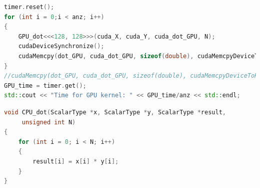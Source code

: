 \documentclass[11pt,a4paper]{article}
\begin{document}
\begin{lstlisting}[language=C++, caption={CUDA benchmark}]
timer.reset();
for (int i = 0;i < anz; i++)
{
	GPU_dot<<<128, 128>>>(cuda_X, cuda_Y, cuda_dot_GPU, N);
	cudaDeviceSynchronize();
	cudaMemcpy(dot_GPU, cuda_dot_GPU, sizeof(double), cudaMemcpyDeviceToHost);
}
//cudaMemcpy(dot_GPU, cuda_dot_GPU, sizeof(double), cudaMemcpyDeviceToHost);
GPU_time = timer.get();
std::cout << "Time for GPU kernel: " << GPU_time/anz << std::endl;
\end{lstlisting}
\newpage
\begin{lstlisting}[language=C++, caption={CPU kernel}]
void CPU_dot(ScalarType *x, ScalarType *y, ScalarType *result,
     unsigned int N)
{
	for (int i = 0; i < N; i++)
	{
		result[i] = x[i] * y[i];
	}
}
\end{lstlisting}
\end{document}
